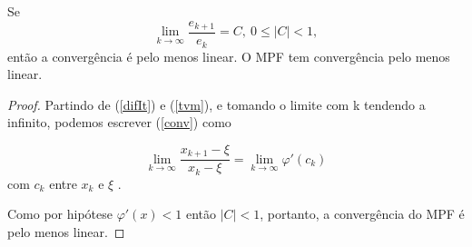 \begin{prop}
    Se 
    \begin{equation}\label{conv}
        \lim_{k \to \infty} \frac{e_{k+1}}{e_k} = C, \ 0 \leq |C| < 1,
    \end{equation}
    então a convergência é pelo menos linear. O MPF tem convergência pelo menos linear.
\end{prop}
\begin{proof}
Partindo de (\ref{difIt}) e (\ref{tvm}), e tomando o  limite com k tendendo a infinito, podemos escrever (\ref{conv}) como

\begin{equation*} %
    \lim_{k \to \infty} \frac{x_{k+1} - \xi}{x_k - \xi} = \lim_{k \to \infty}\varphi'(c_k)
\end{equation*} %
com $c_k$ entre $x_k$ e $\xi$
. %

Como por hipótese $\varphi'(x) < 1$ então $|C| < 1$, portanto, a convergência do MPF é pelo menos linear.
\end{proof}
\newpage
    
